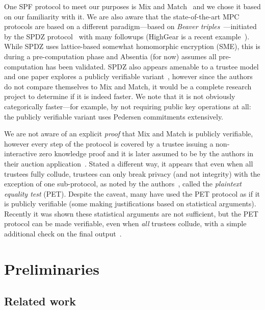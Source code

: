 One SPF protocol to meet our purposes is Mix and Match~\cite{JJ00} and we chose it based on our familiarity with it. We are also aware that the state-of-the-art MPC protocols are based on a different paradigm---based on \emph{Beaver triples}~\cite{beaver1997commodity}---initiated by the SPDZ protocol~\cite{damgaard2012multiparty,damgaard2013practical} with many followups (HighGear is a recent example~\cite{keller2018overdrive}). While SPDZ uses lattice-based somewhat homomorphic encryption (SME), this is during a pre-computation phase and Absentia (for now) assumes all pre-computation has been validated. SPDZ also appears amenable to a trustee model and one paper explores a publicly verifiable variant~\cite{baum2014publicly}, however since the authors do not compare themselves to Mix and Match, it would be a complete research project to determine if it is indeed faster. We note that it is not obviously categorically faster---for example, by not requiring public key operations at all: the publicly verifiable variant uses Pedersen commitments extensively.  

We are not aware of an explicit \emph{proof} that Mix and Match is publicly verifiable, however every step of the protocol is covered by a trustee issuing a non-interactive zero knowledge proof and it is later assumed to be by the authors in their auction application~\cite{JJ00}. Stated a different way, it appears that even when all trustees fully collude, trustees can only break privacy (and not integrity) with the exception of one sub-protocol, as noted by the authors~\cite{JJ00}, called the \emph{plaintext equality test} (PET). Despite the caveat, many have used the PET protocol as if it is publicly verifiable (some making justifications based on statistical arguments). Recently it was shown these statistical arguments are not sufficient, but the PET protocol can be made verifiable, even when \emph{all} trustees collude, with a simple additional check on the final output~\cite{mcmurtry2020test}.


\section{Preliminaries}

\subsection{Related work}
\label{sec:lit}

